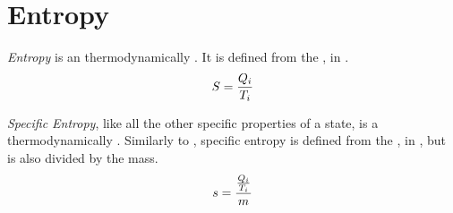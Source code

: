\section{Entropy}\label{sec:Entropy}


\begin{definition}[Entropy]\label{def:Entropy}
  \emph{Entropy} is an thermodynamically .
  It is defined from the , in .
  \begin{equation}\label{eq:Entropy}
    S = \frac{Q_{i}}{T_{i}}
  \end{equation}
\end{definition}

\begin{definition}\label{def:Specific_Entropy}
  \emph{Specific Entropy}, like all the other specific properties of a state, is a thermodynamically .
  Similarly to , specific entropy is defined from the , in , but is also divided by the mass.
  \begin{equation}\label{eq:Entropy}
    s = \frac{\frac{Q_{i}}{T_{i}}}{m}
  \end{equation}
\end{definition}

